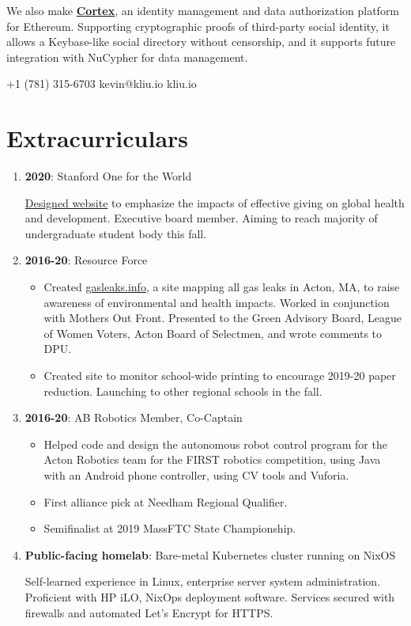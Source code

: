 \documentclass[paper=letter]{tccv}
\begin{document}
We also make \href{https://mycortex.tech}{\textbf{Cortex}}, an identity management and data authorization platform for Ethereum. Supporting cryptographic proofs of third-party social identity, it allows a Keybase-like social directory without censorship, and it supports future integration with NuCypher for data management.

    {+1 (781) 315-6703}
    {kevin@kliu.io}
    {kliu.io}

\section{Extracurriculars}

\begin{enumerate}
     \item \textbf{2020}: Stanford One for the World
     
             \href{https://onefortheworld.su.domains}{Designed website} to emphasize the impacts of effective giving on global health and development. Executive board member. Aiming to reach majority of undergraduate student body this fall.
         \item \textbf{2016-20}: Resource Force
             \begin{itemize}
                \item Created \href{https://gasleaks.info}{gasleaks.info}, a site mapping all gas leaks in Acton, MA, to raise awareness of environmental and health impacts. Worked in conjunction with Mothers Out Front. Presented to the Green Advisory Board, League of Women Voters, Acton Board of Selectmen, and wrote comments to DPU.
                \item Created site to monitor school-wide printing to encourage 2019-20 paper reduction. Launching to other regional schools in the fall.
             \end{itemize}
      
         \item \textbf{2016-20}: AB Robotics Member, Co-Captain
             \begin{itemize}
                \item Helped code and design the autonomous robot control program for the Acton Robotics team for the FIRST robotics competition, using Java with an Android phone controller, using CV tools and Vuforia.
                \item First alliance pick at Needham Regional Qualifier.
                \item Semifinalist at 2019 MassFTC State Championship.
             \end{itemize}
    \item \textbf{Public-facing homelab}: Bare-metal Kubernetes cluster running on NixOS

    Self-learned experience in Linux, enterprise server system administration. Proficient with HP iLO, NixOps deployment software. Services secured with firewalls and automated Let's Encrypt for HTTPS.
     
\end{enumerate}
\end{document}
